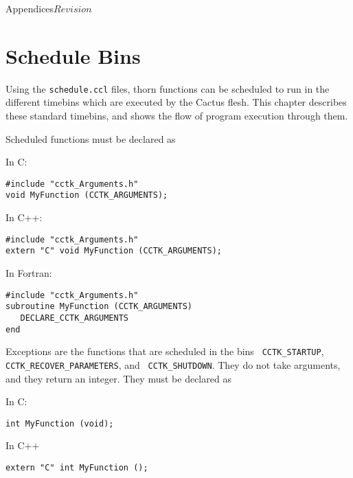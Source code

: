 \begin{cactuspart}{Appendices}{}{$Revision$}


\chapter{Schedule Bins}
\label{sec:Appendix.schedule_bins}

Using the {\tt schedule.ccl} files, thorn functions can be scheduled to run 
in the different timebins which are executed by the Cactus flesh. This chapter
describes these standard timebins, and shows the flow of program execution
through them.

Scheduled functions must be declared as
\begin{Lentry}

\item[In C:]
\begin{verbatim}
#include "cctk_Arguments.h"
void MyFunction (CCTK_ARGUMENTS);
\end{verbatim}

\item[In C++:]
\begin{verbatim}
#include "cctk_Arguments.h"
extern "C" void MyFunction (CCTK_ARGUMENTS);
\end{verbatim}

\item[In Fortran:]
\begin{verbatim}
#include "cctk_Arguments.h"
subroutine MyFunction (CCTK_ARGUMENTS)
   DECLARE_CCTK_ARGUMENTS
end
\end{verbatim}
\end{Lentry}

Exceptions are the functions that are scheduled in the bins {\tt
CCTK\_STARTUP}, {\tt CCTK\_RECOVER\_PARAMETERS}, and {\tt
CCTK\_SHUTDOWN}.  They do not take arguments,
and they return an integer.  They must be declared as
\begin{Lentry}

\item[In C:]
\begin{verbatim}
int MyFunction (void);
\end{verbatim}

\item[In C++]
\begin{verbatim}
extern "C" int MyFunction ();
\end{verbatim}


\end{Lentry}
\end{cactuspart}
